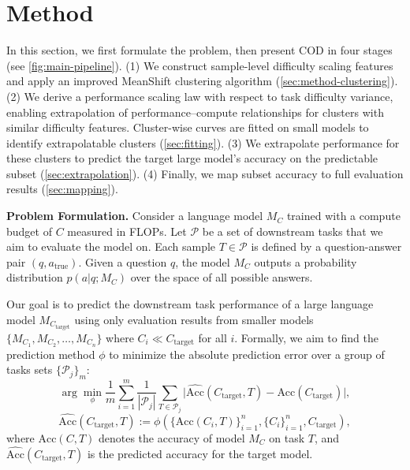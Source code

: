 \vspace{-7pt}
\section{Method}
\vspace{-5pt}
\label{sec:method}

In this section, we first formulate the problem, then present COD in four stages (see \cref{fig:main-pipeline}).
(1) We construct sample-level difficulty scaling features and apply an improved MeanShift clustering algorithm (\cref{sec:method-clustering}).
(2) We derive a performance scaling law with respect to task difficulty variance, enabling extrapolation of performance–compute relationships for clusters with similar difficulty features. Cluster-wise curves are fitted on small models to identify extrapolatable clusters (\cref{sec:fitting}).
(3) We extrapolate performance for these clusters to predict the target large model’s accuracy on the predictable subset (\cref{sec:extrapolation}).
(4) Finally, we map subset accuracy to full evaluation results (\cref{sec:mapping}).

\textbf{Problem Formulation.} Consider a language model $M_C$ trained with a compute budget of $C$ measured in FLOPs. Let $\mathcal{P}$ be a set of downstream tasks that we aim to evaluate the model on. Each sample $T \in \mathcal{P}$ is defined by a question-answer pair $(q, a_{\text{true}})$. Given a question $q$, the model $M_C$ outputs a probability distribution $p(a|q; M_C)$ over the space of all possible answers.



Our goal is to predict the downstream task performance of a large language model $M_{C_{\text{target}}}$ using only evaluation results from smaller models $\{M_{C_1}, M_{C_2}, \ldots, M_{C_n}\}$ where $C_i \ll C_{\text{target}}$ for all $i$. Formally, we aim to find the prediction method $\phi$ to minimize the absolute prediction error over a group of tasks sets $\{\mathcal{P}_j\}_m$:
$$\arg\min_{\phi}\frac{1}{m}\sum_{i=1}^m\frac{1}{|\mathcal{P}_j|}\sum_{T\in \mathcal{P}_j}\vert\widehat{\text{Acc}}(C_{\text{target}}, T)-\text{Acc}(C_{\text{target}})\vert,$$
$$\widehat{\text{Acc}}(C_{\text{target}}, T) := \phi\left(\{\text{Acc}(C_i, T)\}_{i=1}^{n}, \{C_i\}_{i=1}^{n}, C_{\text{target}}\right),$$
where $\text{Acc}(C, T)$ denotes the accuracy of model $M_C$ on task $T$, and $\widehat{\text{Acc}}(C_{\text{target}}, T)$ is the predicted accuracy for the target model.


